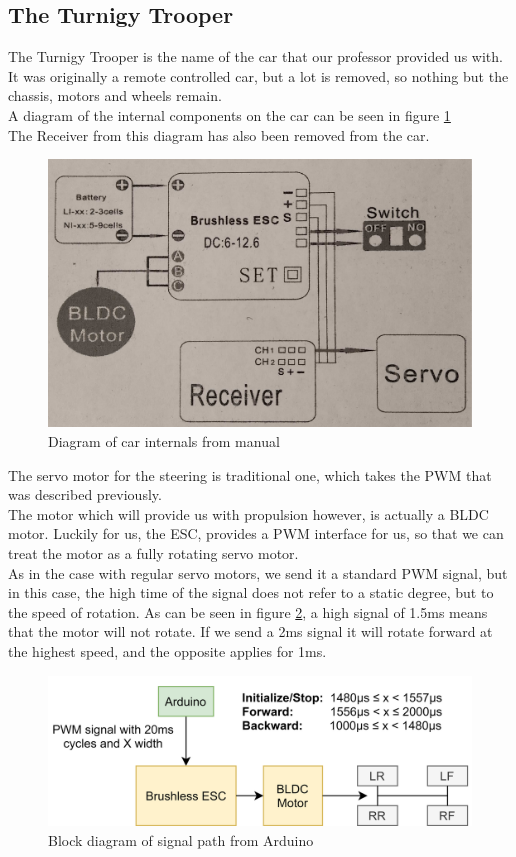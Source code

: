 \documentclass{article}
\begin{document}
\subsection{The Turnigy Trooper}
The Turnigy Trooper is the name of the car that our professor provided us with. It was originally a remote controlled car, but a lot is removed, so nothing but the chassis, motors and wheels remain.\\

A diagram of the internal components on the car can be seen in figure \ref{carManual}\\
The Receiver from this diagram has also been removed from the car.

\begin{figure}[H]
  \centering
  \includegraphics[width=0.8\linewidth]{carManual.png}
  \caption{Diagram of car internals from manual}
  \label{carManual}
\end{figure}


The servo motor for the steering is traditional one, which takes the PWM that was described previously.\\

The motor which will provide us with propulsion however, is actually a BLDC motor. Luckily for us, the ESC, provides a PWM interface for us, so that we can treat the motor as a fully rotating servo motor.\\

As in the case with regular servo motors, we send it a standard PWM signal, but in this case, the high time of the signal does not refer to a static degree, but to the speed of rotation. As can be seen in figure \ref{esc}, a high signal of 1.5ms means that the motor will not rotate. If we send a 2ms signal it will rotate forward at the highest speed, and the opposite applies for 1ms.

\begin{figure}[H]
	\centering
	\includegraphics[width=\linewidth]{brushless-motor-esc.png}
	\caption{Block diagram of signal path from Arduino}
	\label{esc}
\end{figure}
\end{document}

